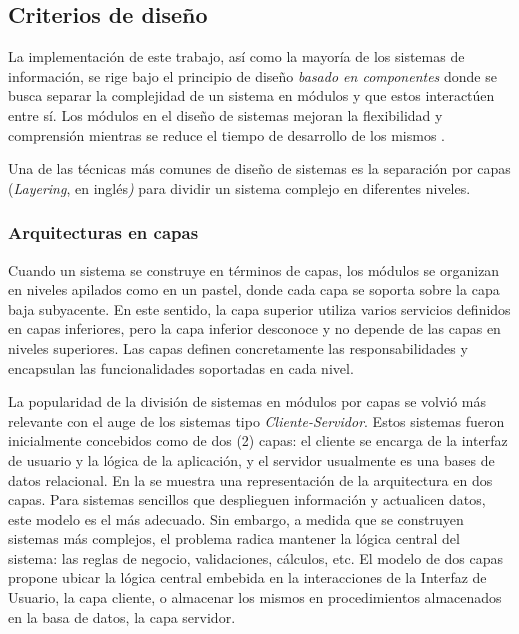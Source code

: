\subsection{Criterios de diseño}

La implementación de este trabajo, así como la mayoría de los sistemas
de información, se rige bajo el principio de diseño \emph{basado en
componentes} donde se busca separar la complejidad de un sistema en
módulos y que estos interactúen entre sí. Los módulos en el diseño
de sistemas mejoran la flexibilidad y comprensión mientras se reduce
el tiempo de desarrollo de los mismos \cite{Parnas1972}.

Una de las técnicas más comunes de diseño de sistemas\emph{ }es la
separación por capas (\emph{Layering}, en inglés\emph{)} para dividir
un sistema complejo \cite{Fowler2002} en diferentes niveles. 

\subsubsection{Arquitecturas en capas}

Cuando un sistema se construye en términos de capas, los módulos se
organizan en niveles apilados como en un pastel, donde cada capa se
soporta sobre la capa baja subyacente. En este sentido, la capa superior
utiliza varios servicios definidos en capas inferiores, pero la capa
inferior desconoce y no depende de las capas en niveles superiores.
Las capas definen concretamente las responsabilidades y encapsulan
las funcionalidades soportadas en cada nivel.

La popularidad de la división de sistemas en módulos por capas se
volvió más relevante con el auge de los sistemas tipo \emph{Cliente-Servidor}.
Estos sistemas fueron inicialmente concebidos como de dos (2) capas:
el cliente se encarga de la interfaz de usuario y la lógica de la
aplicación, y el servidor usualmente es una bases de datos relacional.
En la  se muestra una representación
de la arquitectura en dos capas. Para sistemas sencillos que desplieguen
información y actualicen datos, este modelo es el más adecuado. Sin
embargo, a medida que se construyen sistemas más complejos, el problema
radica mantener la lógica central del sistema: las reglas de negocio,
validaciones, cálculos, etc. El modelo de dos capas propone ubicar
la lógica central embebida en la interacciones de la Interfaz de Usuario,
la capa cliente, o almacenar los mismos en procedimientos almacenados
en la basa de datos, la capa servidor.

